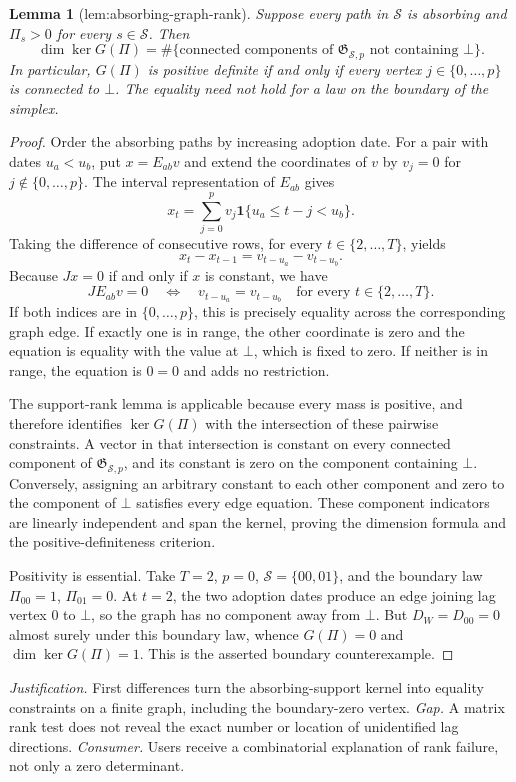 \documentclass{article}
\newtheorem{lemma}{Lemma}
\begin{document}
\begin{lemma}[lem:absorbing-graph-rank]\label{lem:absorbing-graph-rank}
Suppose every path in \(\mathcal S\) is absorbing and \(\Pi_s>0\) for every \(s\in\mathcal S\).  Then
\[
 \dim\ker G(\Pi)
 =\#\{\text{connected components of }\mathfrak G_{\mathcal S,p}\text{ not containing }\bot\}.
\]
In particular, \(G(\Pi)\) is positive definite if and only if every vertex \(j\in\{0,\ldots,p\}\) is connected to \(\bot\).  The equality need not hold for a law on the boundary of the simplex.
\end{lemma}
\begin{proof}
Order the absorbing paths by increasing adoption date.  For a pair with dates \(u_a<u_b\), put \(x=E_{ab}v\) and extend the coordinates of \(v\) by \(v_j=0\) for \(j\notin\{0,\ldots,p\}\).  The interval representation of \(E_{ab}\) gives
\[
 x_t=\sum_{j=0}^{p}v_j\mathbf 1\{u_a\leq t-j<u_b\}.
\]
Taking the difference of consecutive rows, for every \(t\in\{2,\ldots,T\}\), yields
\[
 x_t-x_{t-1}=v_{t-u_a}-v_{t-u_b}.
\]
Because \(Jx=0\) if and only if \(x\) is constant, we have
\[
 JE_{ab}v=0
 \quad\Longleftrightarrow\quad
 v_{t-u_a}=v_{t-u_b}\quad\text{for every }t\in\{2,\ldots,T\}.
\]
If both indices are in \(\{0,\ldots,p\}\), this is precisely equality across the corresponding graph edge.  If exactly one is in range, the other coordinate is zero and the equation is equality with the value at \(\bot\), which is fixed to zero.  If neither is in range, the equation is \(0=0\) and adds no restriction.

The support-rank lemma is applicable because every mass is positive, and therefore identifies \(\ker G(\Pi)\) with the intersection of these pairwise constraints.  A vector in that intersection is constant on every connected component of \(\mathfrak G_{\mathcal S,p}\), and its constant is zero on the component containing \(\bot\).  Conversely, assigning an arbitrary constant to each other component and zero to the component of \(\bot\) satisfies every edge equation.  These component indicators are linearly independent and span the kernel, proving the dimension formula and the positive-definiteness criterion.

Positivity is essential.  Take \(T=2\), \(p=0\), \(\mathcal S=\{00,01\}\), and the boundary law \(\Pi_{00}=1\), \(\Pi_{01}=0\).  At \(t=2\), the two adoption dates produce an edge joining lag vertex \(0\) to \(\bot\), so the graph has no component away from \(\bot\).  But \(D_W=D_{00}=0\) almost surely under this boundary law, whence \(G(\Pi)=0\) and \(\dim\ker G(\Pi)=1\).  This is the asserted boundary counterexample.
\end{proof}
\par\smallskip\noindent \textit{Justification.} First differences turn the absorbing-support kernel into equality constraints on a finite graph, including the boundary-zero vertex. \textit{Gap.} A matrix rank test does not reveal the exact number or location of unidentified lag directions. \textit{Consumer.} Users receive a combinatorial explanation of rank failure, not only a zero determinant.
\end{document}
